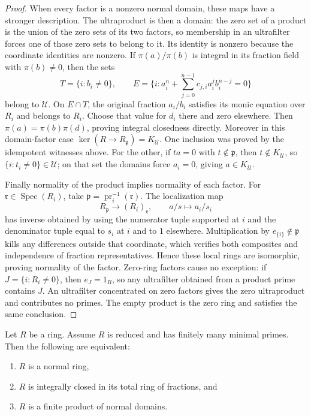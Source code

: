 \begin{proof}
When every factor is a nonzero normal domain, these maps have
a stronger description. The ultraproduct is then a domain:
the zero set of a product is the union of the zero sets of its
two factors, so membership in an ultrafilter forces one of those
zero sets to belong to it. Its identity is nonzero because the
coordinate identities are nonzero. If $\pi(a)/\pi(b)$ is integral
in its fraction field with $\pi(b)\ne0$, then the sets
$$
T=\{i:b_i\ne0\},\qquad
E=\{i:a_i^n+\sum_{j=0}^{n-1}c_{j,i}a_i^jb_i^{n-j}=0\}
$$
belong to $\mathcal U$. On $E\cap T$, the original fraction
$a_i/b_i$ satisfies its monic equation over $R_i$ and belongs
to $R_i$. Choose that value for $d_i$ there and zero elsewhere.
Then $\pi(a)=\pi(b)\pi(d)$, proving integral closedness directly.
Moreover in this domain-factor case
$\ker(R\to R_{\mathfrak p})=K_{\mathcal U}$.
One inclusion was proved by the idempotent witnesses above.
For the other, if $ta=0$ with $t\notin\mathfrak p$, then
$t\notin K_{\mathcal U}$, so $\{i:t_i\ne0\}\in\mathcal U$;
on that set the domains force $a_i=0$, giving $a\in K_{\mathcal U}$.

Finally normality of the product implies normality of each factor.
For $\mathfrak r\in\operatorname{Spec}(R_i)$, take
$\mathfrak p=\operatorname{pr}_i^{-1}(\mathfrak r)$.
The localization map
$$
R_{\mathfrak p}\longrightarrow(R_i)_{\mathfrak r},
\qquad a/s\longmapsto a_i/s_i
$$
has inverse obtained by using the numerator tuple supported at $i$
and the denominator tuple equal to $s_i$ at $i$ and to $1$ elsewhere.
Multiplication by $e_{\{i\}}\notin\mathfrak p$ kills any
differences outside that coordinate, which verifies both composites
and independence of fraction representatives. Hence these local
rings are isomorphic, proving normality of the factor.
Zero-ring factors cause no exception: if $J=\{i:R_i\ne0\}$,
then $e_J=1_R$, so any ultrafilter obtained from a product prime
contains $J$. An ultrafilter concentrated on zero factors gives
the zero ultraproduct and contributes no primes. The empty product
is the zero ring and satisfies the same conclusion.
\end{proof}

\begin{lemma}
\label{editorial-source-lemma-characterize-reduced-ring-normal}
Let $R$ be a ring. Assume $R$ is reduced and has finitely many
minimal primes. Then the following are equivalent:
\begin{enumerate}
\item $R$ is a normal ring,
\item $R$ is integrally closed in its total ring of fractions, and
\item $R$ is a finite product of normal domains.
\end{enumerate}
\end{lemma}

